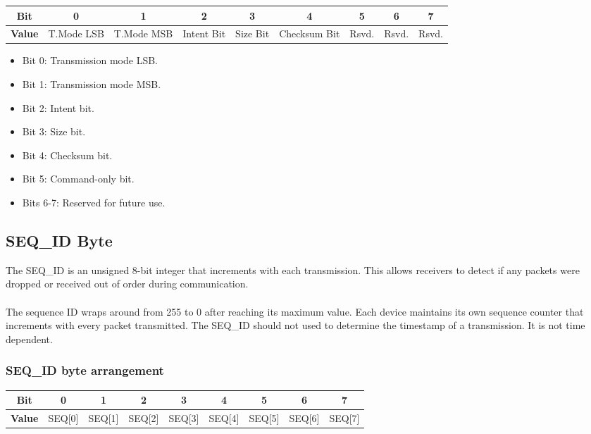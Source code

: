 \documentclass{article}
\begin{document}
    \begin{table}[h]
        \centering
        \begin{tabular}{|c|c|c|c|c|c|c|c|c|}
            \hline
            \textbf{Bit}   & 0               & 1               & 2          & 3     & 4     & 5     & 6     & 7     \\
            \hline
            \textbf{Value} & T.Mode LSB & T.Mode MSB & Intent Bit & Size Bit & Checksum Bit & Rsvd. & Rsvd. & Rsvd. \\
            \hline
        \end{tabular}
    \end{table}

    \begin{itemize}
        \item Bit 0: Transmission mode LSB.
        \item Bit 1: Transmission mode MSB.
        \item Bit 2: Intent bit. 
        \item Bit 3: Size bit. 
        \item Bit 4: Checksum bit.
        \item Bit 5: Command-only bit.

        \item Bits 6-7: Reserved for future use.
    \end{itemize}

    \subsection{SEQ\_ID Byte}
    The SEQ\_ID is an unsigned 8-bit integer that increments with each transmission.
    This allows receivers to detect if any packets were dropped or received out
    of order during communication. \\
    \\
    The sequence ID wraps around from 255 to 0 after reaching its maximum value.
    Each device maintains its own sequence counter that increments with every packet
    transmitted.
    The SEQ\_ID should not used to determine the timestamp of a transmission. It is not time dependent.
    
    \subsubsection{SEQ\_ID byte arrangement}

    \begin{table}[h]
        \centering
        \begin{tabular}{|c|c|c|c|c|c|c|c|c|}
            \hline
            \textbf{Bit}   & 0      & 1      & 2      & 3      & 4      & 5      & 6      & 7      \\
            \hline
            \textbf{Value} & SEQ[0] & SEQ[1] & SEQ[2] & SEQ[3] & SEQ[4] & SEQ[5] & SEQ[6] & SEQ[7] \\
            \hline
        \end{tabular}
    \end{table}
\end{document}
